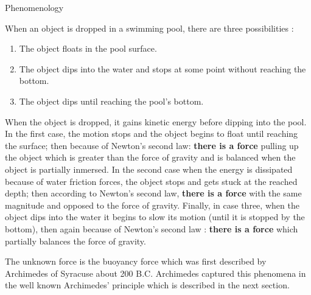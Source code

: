 \begin{section}{Phenomenology}
    
    When an object is dropped in a swimming pool, there are three possibilities :

    \begin{enumerate}
        \item The object floats in the pool surface.
        \item The object dips into the water and stops at some point without reaching the bottom.
        \item The object dips until reaching the pool's bottom.
    \end{enumerate}
    
    When the object is dropped, it gains kinetic energy before dipping into the pool. In the first 
    case, the motion stops and the object begins to float until reaching the surface; then because 
    of  Newton's second law: \textbf{there is a force} pulling up the object which is greater than 
    the force of gravity and is balanced when the object is partially inmersed. In the second case 
    when the energy is dissipated because of water friction forces, the object stops and gets stuck 
    at the reached depth; then according to Newton's second law, \textbf{there is a force} with the 
    same magnitude and opposed to the force of gravity. Finally, in case three, when the object dips 
    into the water it begins to slow its motion (until it is stopped by the bottom), then again 
    because of Newton's second law : \textbf{there is a force} which partially balances the force of 
    gravity.
    
    The unknown force is the buoyancy force which was first described by Archimedes of Syracuse about
    200 B.C. Archimedes captured this phenomena in the well known Archimedes' principle which is 
    described in the next section.
\end{section}

